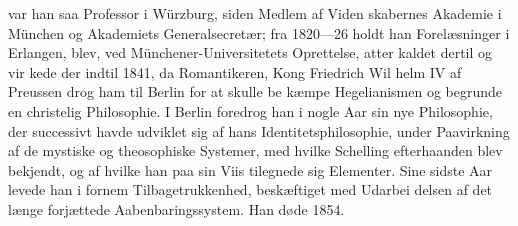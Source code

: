 \documentclass[12pt,a4paper]{book}
\begin{document}
var han saa Professor i Würzburg, siden Medlem af Viden\-%
skabernes Akademie i München og Akademiets Generalsecretær;
fra 1820---26 holdt han Forelæsninger i Erlangen, blev, ved
Münchener-Universitetets Oprettelse, atter kaldet dertil og vir\-%
kede der indtil 1841, da Romantikeren, Kong Friedrich Wil\-%
helm IV af Preussen drog ham til Berlin for at skulle be\-%
kæmpe Hegelianismen og begrunde en christelig Philosophie.
I Berlin foredrog han i nogle Aar sin nye Philosophie, der
successivt havde udviklet sig af hans Identitetsphilosophie,
under Paavirkning af de mystiske og theosophiske Systemer,
med hvilke Schelling efterhaanden blev bekjendt, og af hvilke
han paa sin Viis tilegnede sig Elementer. Sine sidste Aar levede
han i fornem Tilbagetrukkenhed, beskæftiget med Udarbei\-%
delsen af det længe forjættede Aabenbaringssystem. Han
døde 1854.
\end{document}
